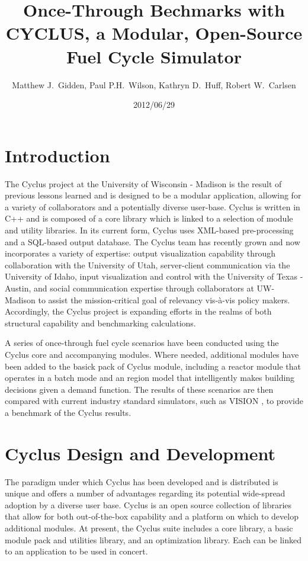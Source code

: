 \documentclass{anstrans}
\title{Once-Through Bechmarks with CYCLUS, a Modular, Open-Source Fuel Cycle Simulator}
\author{Matthew J.~Gidden, Paul P.H.~Wilson, Kathryn D.~Huff, Robert W.~Carlsen}
\institute{Department of Nuclear Engineering \& Engineering Physics, University of Wisconsin - Madison, Madison, WI, 53703}
\date{2012/06/29}
\begin{document}
\section{Introduction}
The Cyclus project at the University of Wisconsin - Madison is the result of previous lessons learned and is designed to be a 
modular application, allowing for a variety of collaborators and a potentially diverse user-base. Cyclus is written in C++ and
is composed of a core library which is linked to a selection of module and utility libraries. In its current form, Cyclus uses
XML-based pre-processing and a SQL-based output database. The Cyclus team has recently grown and now incorporates a variety of 
expertise: output visualization capability through collaboration with the University of Utah, server-client communication via the 
University of Idaho, input visualization and control with the University of Texas - Austin, and social communication expertise 
through collaborators at UW-Madison to assist the mission-critical goal of relevancy vis-\`{a}-vis policy makers. Accordingly, the 
Cyclus project is expanding efforts in the realms of both structural capability and benchmarking calculations.

A series of once-through fuel cycle scenarios have been conducted using the Cyclus core and accompanying modules. Where needed,
additional modules have been added to the basick pack of Cyclus module, including a reactor module that operates in a batch 
mode and an region model that intelligently makes building decisions given a demand function. The results of these scenarios
are then compared with current industry standard simulators, such as VISION \cite{vision2009}, to provide a benchmark of the
Cyclus results.
\section{Cyclus Design and Development}
The paradigm under which Cyclus has been developed and is distributed is unique and offers a number of advantages regarding its 
potential wide-spread adoption by a diverse user base. Cyclus is an open source collection of libraries that
allow for both out-of-the-box capability and a platform on which to develop additional modules. At present, the Cyclus suite 
includes a core library, a basic module pack and utilities library, and an optimization library. Each can be linked to an 
application to be used in concert.
\end{document}

